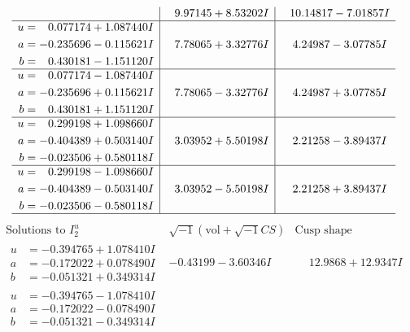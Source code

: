 \documentclass[1p]{elsarticle_modified}
\theoremstyle{definition}
\newcommand{\I}{\sqrt{-1}}
\begin{document}
$$\begin{array}{c|c|c}
 & \phantom{-}9.97145 + 8.53202 I & \phantom{-}10.14817 - 7.01857 I \\ \hline\begin{aligned}
u &= \phantom{-}0.077174 + 1.087440 I \\
a &= -0.235696 - 0.115621 I \\
b &= \phantom{-}0.430181 - 1.151120 I\end{aligned}
 & \phantom{-}7.78065 + 3.32776 I & \phantom{-}4.24987 - 3.07785 I \\ \hline\begin{aligned}
u &= \phantom{-}0.077174 - 1.087440 I \\
a &= -0.235696 + 0.115621 I \\
b &= \phantom{-}0.430181 + 1.151120 I\end{aligned}
 & \phantom{-}7.78065 - 3.32776 I & \phantom{-}4.24987 + 3.07785 I \\ \hline\begin{aligned}
u &= \phantom{-}0.299198 + 1.098660 I \\
a &= -0.404389 + 0.503140 I \\
b &= -0.023506 + 0.580118 I\end{aligned}
 & \phantom{-}3.03952 + 5.50198 I & \phantom{-}2.21258 - 3.89437 I \\ \hline\begin{aligned}
u &= \phantom{-}0.299198 - 1.098660 I \\
a &= -0.404389 - 0.503140 I \\
b &= -0.023506 - 0.580118 I\end{aligned}
 & \phantom{-}3.03952 - 5.50198 I & \phantom{-}2.21258 + 3.89437 I\\
 \hline 
 \end{array}$$\newpage$$\begin{array}{c|c|c}  
\text{Solutions to }I^u_{2}& \I (\text{vol} + \sqrt{-1}CS) & \text{Cusp shape}\\
 \hline 
\begin{aligned}
u &= -0.394765 + 1.078410 I \\
a &= -0.172022 + 0.078490 I \\
b &= -0.051321 + 0.349314 I\end{aligned}
 & -0.43199 - 3.60346 I & \phantom{-}12.9868 + 12.9347 I \\ \hline\begin{aligned}
u &= -0.394765 - 1.078410 I \\
a &= -0.172022 - 0.078490 I \\
b &= -0.051321 - 0.349314 I\end{aligned}

\end{array}$$
\end{document}

